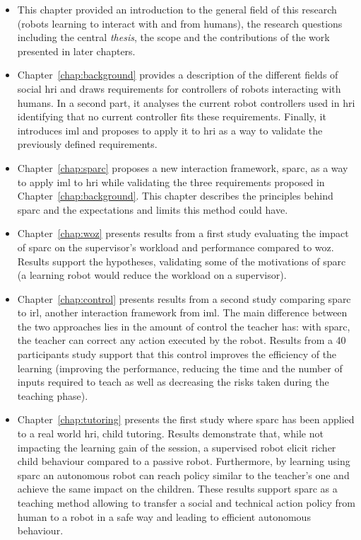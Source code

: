 \begin{itemize}
	\item This chapter provided an introduction to the general field of this research (robots learning to interact with and from humans), the research questions including the central \emph{thesis}, the scope and the contributions of the work presented in later chapters.  

	\item Chapter~\ref{chap:background} provides a description of the different fields of social \gls{hri} and draws requirements for controllers of robots interacting with humans. In a second part, it analyses the current robot controllers used in \gls{hri} identifying that no current controller fits these requirements. Finally, it introduces \gls{iml} and proposes to apply it to \gls{hri} as a way to validate the previously defined requirements.
	
	\item Chapter~\ref{chap:sparc} proposes a new interaction framework, \gls{sparc}, as a way to apply \gls{iml} to \gls{hri} while validating the three requirements proposed in Chapter~\ref{chap:background}. This chapter describes the principles behind \gls{sparc} and the expectations and limits this method could have.
	
	\item Chapter~\ref{chap:woz} presents results from a first study evaluating the impact of \gls{sparc} on the supervisor's workload and performance compared to \gls{woz}. Results support the hypotheses, validating some of the motivations of \gls{sparc} (a learning robot would reduce the workload on a supervisor).
	
	\item Chapter~\ref{chap:control} presents results from a second study comparing \gls{sparc} to \gls{irl}, another interaction framework from \gls{iml}. The main difference between the two approaches lies in the amount of control the teacher has: with \gls{sparc}, the teacher can correct any action executed by the robot. Results from a 40 participants study support that this control improves the efficiency of the learning (improving the performance, reducing the time and the number of inputs required to teach as well as decreasing the risks taken during the teaching phase).
	
	\item Chapter~\ref{chap:tutoring} presents the first study where \gls{sparc} has been applied to a real world \gls{hri}, child tutoring. Results demonstrate that, while not impacting the learning gain of the session, a supervised robot elicit richer child behaviour compared to a passive robot. Furthermore, by learning using \gls{sparc} an autonomous robot can reach policy similar to the teacher's one and achieve the same impact on the children. These results support \gls{sparc} as a teaching method allowing to transfer a social and technical action policy from human to a robot in a safe way and leading to efficient autonomous behaviour.
	

\end{itemize}
